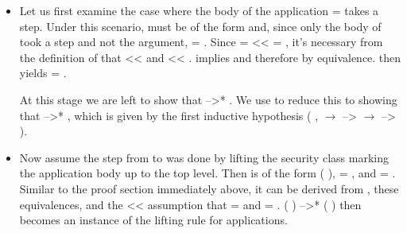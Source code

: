 \documentclass[12pt]{report}
\begin{document}
\begin{itemize}

\item  Let us first examine the case where the body of the
    application  =  
         takes a step. Under this scenario,
         must be of the form 
          and, since only the body
        of  took a step and not the argument,
         = . Since 
        =    <<
          
        = , it's necessary from the definition of
         that  <<
         and  << .
          implies 
         and therefore 
         by equivalence.
         then yields
         = .


    At this stage we are left to show that 
          -->* 
         . We use
         to reduce this to showing that
         -->* , which is given by
        the first inductive hypothesis
        (\coqdockw{\ensuremath{\forall}} ,
          \ensuremath{\rightarrow}
         -->  \ensuremath{\rightarrow}
         --> ).



\item  Now assume the step from  to  was
    done by lifting the security class marking the application body
        up to the top level. Then  is of the form
          (
         ), 
        = , and  = .
        Similar to the proof section immediately above, it can be
        derived from  , these
        equivalences, and the  << 
        assumption that  =  and
         = . 
        (  )
         -->*  
        (  ) then
        becomes an instance of the  lifting rule for
        applications.




\end{itemize}
\end{document}
